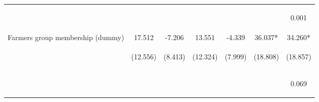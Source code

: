 \begin{center}
\begin{tabular}{lcccccc}
\vspace{4pt} & \begin{footnotesize}[0.361]\end{footnotesize} & \begin{footnotesize}[0.002]\end{footnotesize} & \begin{footnotesize}[0.517]\end{footnotesize} & \begin{footnotesize}[0.145]\end{footnotesize} & \begin{footnotesize}[0.000]\end{footnotesize} & \begin{footnotesize}0.001\end{footnotesize} \\
Farmers group membership (dummy) & 17.512 & -7.206 & 13.551 & -4.339 & 36.037* & 34.260* \\
 & \begin{footnotesize}(12.556)\end{footnotesize} & \begin{footnotesize}(8.413)\end{footnotesize} & \begin{footnotesize}(12.324)\end{footnotesize} & \begin{footnotesize}(7.999)\end{footnotesize} & \begin{footnotesize}(18.808)\end{footnotesize} & \begin{footnotesize}(18.857)\end{footnotesize} \\
\vspace{4pt} & \begin{footnotesize}[0.163]\end{footnotesize} & \begin{footnotesize}[0.392]\end{footnotesize} & \begin{footnotesize}[0.272]\end{footnotesize} & \begin{footnotesize}[0.587]\end{footnotesize} & \begin{footnotesize}[0.055]\end{footnotesize} & \begin{footnotesize}0.069\end{footnotesize} \\

\end{tabular}
\end{center}
